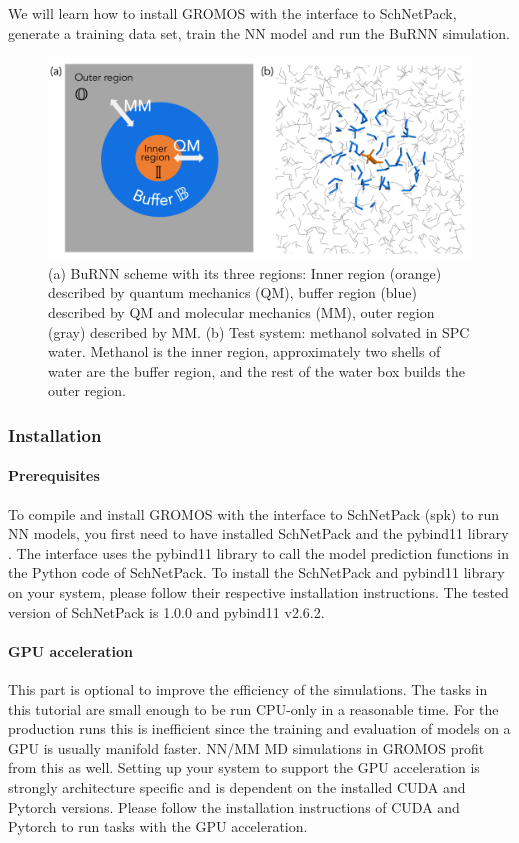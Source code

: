 We will learn how to install GROMOS with the interface to SchNetPack, generate a training data set, train the NN model and run the BuRNN simulation.


\begin{figure}[H]
\centering
\includegraphics[scale=.33]{../09_tutorial_06/figures/BuRNN_scheme}
\caption{(a) BuRNN scheme with its three regions: Inner region (orange) described by quantum mechanics (QM), buffer region (blue) described by QM and molecular mechanics (MM), outer region (gray) described by MM. (b) Test system: methanol solvated in SPC water. Methanol is the inner region, approximately two shells of water are the buffer region, and the rest of the water box builds the outer region.}
\label{BuRNN_scheme}
\end{figure}


\subsubsection{Installation} \label{chap:burnn_install}
\paragraph{Prerequisites}
To compile and install GROMOS with the interface to SchNetPack (spk) to run NN models, you first need to have installed SchNetPack and the pybind11 library \cite{pybind11}. The interface uses the pybind11 library to call the model prediction functions in the Python code of SchNetPack. To install the SchNetPack and pybind11 library on your system, please follow their respective installation instructions. The tested version of SchNetPack is 1.0.0 and pybind11 v2.6.2.

\paragraph{GPU acceleration}
This part is optional to improve the efficiency of the simulations. The tasks in this tutorial are small enough to be run CPU-only in a reasonable time. For the production runs this is inefficient since the training and evaluation of models on a GPU is usually manifold faster. NN/MM MD simulations in GROMOS profit from this as well. Setting up your system to support the GPU acceleration is strongly architecture specific and is dependent on the installed CUDA and Pytorch versions. Please follow the installation instructions of CUDA and Pytorch to run tasks with the GPU acceleration.

